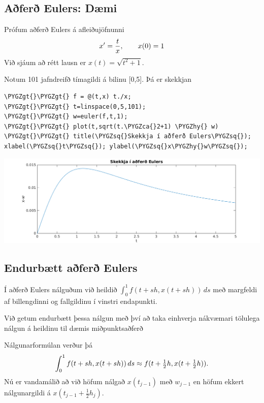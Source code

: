 \documentclass[letterpaper,10pt,icelandic]{sphinxmanual}
\def\PYGZca{\char`\^}
\def\PYGZgt{\char`\>}
\def\PYGZhy{\char`\-}
\def\PYGZsq{\char`\'}
\renewcommand\PYGZsq{\textquotesingle}
\begin{document}
\subsection{Aðferð Eulers: Dæmi}
\label{kafli06:afer-eulers-daemi}
Prófum aðferð Eulers á afleiðujöfnunni
\begin{gather}
\begin{split}x' = \frac tx, \qquad x(0) = 1\end{split}\notag
\end{gather}
Við sjáum að rétt lausn er \(x(t) = \sqrt{t^2+ 1}\).

Notum 101 jafndreifð tímagildi á bilinu {[}0,5{]}. Þá er skekkjan

\begin{Verbatim}[commandchars=\\\{\}]
\PYGZgt{}\PYGZgt{} f = @(t,x) t./x;
\PYGZgt{}\PYGZgt{} t=linspace(0,5,101);
\PYGZgt{}\PYGZgt{} w=euler(f,t,1);
\PYGZgt{}\PYGZgt{} plot(t,sqrt(t.\PYGZca{}2+1) \PYGZhy{} w)
\PYGZgt{}\PYGZgt{} title(\PYGZsq{}Skekkja í aðferð Eulers\PYGZsq{}); xlabel(\PYGZsq{}t\PYGZsq{}); ylabel(\PYGZsq{}x\PYGZhy{}w\PYGZsq{});
\end{Verbatim}

\includegraphics{7euler.png}


\subsection{Endurbætt aðferð Eulers}
\label{kafli06:index-8}\label{kafli06:endurbaett-afer-eulers}
Í aðferð Eulers nálguðum við heildið
\(\int_0^1 f(t+sh,x(t+sh))\, ds\) með margfeldi af billengdinni og
fallgildinu í vinstri endapunkti.

Við getum endurbætt þessa nálgun með því að taka einhverja nákvæmari
tölulega nálgun á heildinu til dæmis miðpunktsaðferð

Nálgunarformúlan verður þá
\begin{gather}
\begin{split}\int_0^1f(t+sh,x(t+sh))\, ds \approx f(t+\tfrac 12h,x(t+\tfrac 12 h)).\end{split}\notag
\end{gather}
Nú er vandamálið að við höfum nálgað \(x(t_{j-1})\) með
\(w_{j-1}\) en höfum ekkert nálgunargildi á
\(x(t_{j-1}+\frac 12 h_j)\).
\end{document}
